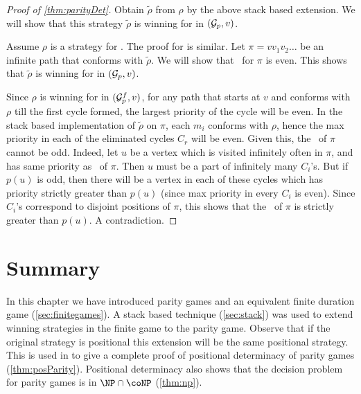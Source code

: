 \begin{proof}[Proof of \autoref{thm:parityDet}]
    Obtain $\tilde{\rho}$ from $\rho$ by the above stack based extension. We will show that this strategy $ \tilde{\rho}$ is winning for  in $(\mathcal{G}_p,v)$.

    Assume $\rho$ is a strategy for . The proof for  is similar. Let $\pi = v v_1 v_2 \ldots $ be an infinite path that conforms with $\tilde{\rho}$. We will show that \mip\ for $\pi$ is even. This shows that $\tilde{\rho}$ is winning for  in $(\mathcal{G}_p,v)$.

    Since $\rho$ is winning for  in $(\mathcal{G}^f_p,v)$, for any path that starts at $v$ and conforms with $\rho$ till the first cycle formed, the largest priority of the cycle will be even. In the stack based implementation of $ \tilde{\rho}$ on $\pi$, each $m_i$ conforms with $\rho$, hence the max priority in each of the eliminated cycles $C_r$ will be even. Given this, the \mip\ of $\pi$ cannot be odd. Indeed, let $u$ be a vertex which is visited infinitely often in $\pi$, and has same priority as \mip\ of $\pi$. Then $u$ must be a part of infinitely many $C_i$'s. But if $p(u)$ is odd, then there will be a vertex in each of these cycles which has priority strictly greater than $p(u)$ (since max priority in every $C_i$ is even). Since $C_i$'s correspond to disjoint positions of $\pi$, this shows that the \mip\ of $\pi$ is strictly greater than $p(u)$. A contradiction.

\end{proof}

\section{Summary}
In this chapter we have introduced parity games and an equivalent finite duration game (\autoref{sec:finitegames}). A stack based technique (\autoref{sec:stack}) was used to extend winning strategies in the finite game to the parity game. Observe that if the original strategy is positional this extension will be the same positional strategy. This is used in \cite{bjorklund_memoryless_2004} to give a complete proof of positional determinacy of parity games (\autoref{thm:posParity}). Positional determinacy also shows that the decision problem for parity games is in $\NP \cap \coNP$ (\autoref{thm:np}).

